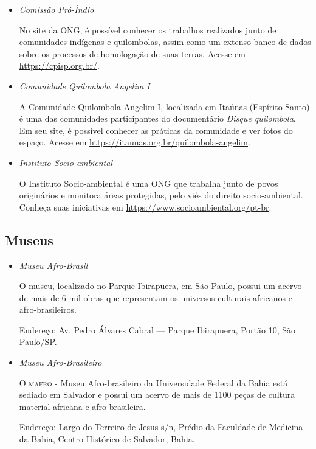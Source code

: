 \documentclass[11pt]{extarticle}
\begin{document}
\begin{itemize}

\item \textit{Comissão Pró-Índio}

No site da ONG, é possível conhecer os trabalhos realizados junto de comunidades indígenas e quilombolas, assim como um extenso banco de dados sobre os processos de homologação de suas terras. Acesse em \url{https://cpisp.org.br/}.

\item \textit{Comunidade Quilombola Angelim I}

A Comunidade Quilombola Angelim I, localizada em Itaúnas (Espírito Santo) é uma das comunidades participantes do documentário \textit{Disque quilombola}. Em seu site, é possível conhecer as práticas da comunidade e ver fotos do espaço. Acesse em \url{https://itaunas.org.br/quilombola-angelim}.

\item \textit{Instituto Socio-ambiental}

O Instituto Socio-ambiental é uma ONG que trabalha junto de povos originários e monitora áreas protegidas, pelo viés do direito socio-ambiental. Conheça suas iniciativas em \url{https://www.socioambiental.org/pt-br}.

\end{itemize}

\subsection{Museus}

\begin{itemize}

\item \textit{Museu Afro-Brasil}

O museu, localizado no Parque Ibirapuera, em São Paulo, possui um acervo de mais de 6 mil obras que representam os universos culturais africanos e afro-brasileiros.

Endereço: Av. Pedro Álvares Cabral — Parque Ibirapuera, Portão 10, São Paulo/SP.

\item \textit{Museu Afro-Brasileiro}

O \textsc{mafro} - Museu Afro-brasileiro da Universidade Federal da Bahia está sediado em Salvador e possui um acervo de mais de 1100 peças de cultura material africana e afro-brasileira.

Endereço: Largo do Terreiro de Jesus s/n, Prédio da Faculdade de Medicina da Bahia, Centro Histórico de Salvador, Bahia.

\end{itemize}
\end{document}
